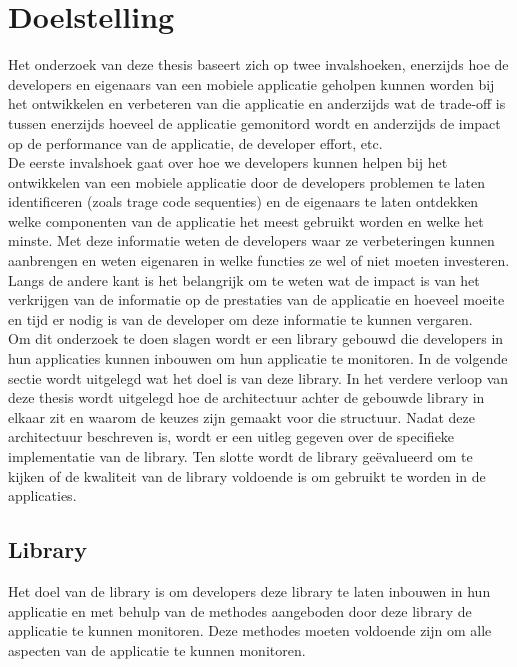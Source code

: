 \chapter{Doelstelling} \label{doelstelling}
Het onderzoek van deze thesis baseert zich op twee invalshoeken, enerzijds hoe de developers en eigenaars van een mobiele applicatie geholpen kunnen worden bij het ontwikkelen en verbeteren van die applicatie en anderzijds wat de trade-off is tussen enerzijds hoeveel de applicatie gemonitord wordt en anderzijds de impact op de performance van de applicatie, de developer effort, etc. \\

De eerste invalshoek gaat over hoe we developers kunnen helpen bij het ontwikkelen van een mobiele applicatie door de developers problemen te laten identificeren (zoals trage code sequenties) en de eigenaars te laten ontdekken welke componenten van de applicatie het meest gebruikt worden en welke het minste. Met deze informatie weten de developers waar ze verbeteringen kunnen aanbrengen en weten eigenaren in welke functies ze wel of niet moeten investeren. Langs de andere kant is het belangrijk om te weten wat de impact is van het verkrijgen van de informatie op de prestaties van de applicatie en hoeveel moeite en tijd er nodig is van de developer om deze informatie te kunnen vergaren.\\


Om dit onderzoek te doen slagen wordt er een library gebouwd die developers in hun applicaties kunnen inbouwen om hun applicatie te monitoren. In de volgende sectie wordt uitgelegd wat het doel is van deze library. In het verdere verloop van deze thesis wordt uitgelegd hoe de architectuur achter de gebouwde library in elkaar zit en waarom de keuzes zijn gemaakt voor die structuur. Nadat deze architectuur beschreven is, wordt er een uitleg gegeven over de specifieke implementatie van de library. Ten slotte wordt de library ge\"evalueerd om te kijken of de kwaliteit van de library voldoende is om gebruikt te worden in de applicaties. 

\section{Library}
Het doel van de library is om developers deze library te laten inbouwen in hun applicatie en met behulp van de methodes aangeboden door deze library de applicatie te kunnen monitoren. Deze methodes moeten voldoende zijn om alle aspecten van de applicatie te kunnen monitoren. \\

